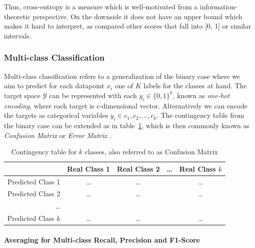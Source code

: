 Thus, cross-entropy is a measure which is well-motivated from a information-theoretic perspective. On the downside it does not have an upper bound which makes it hard to interpret, as compared other scores that fall into [0, 1] or similar intervals.

\subsubsection{Multi-class Classification}
\label{subs:Multi-class Classification}

Multi-class classification refers to a generalization of the binary case where we aim to predict for each datapoint $x_i$ one of $K$ labels for the classes at hand. The target space $\mathcal{Y}$ can be represented with each $y_i \in \{0,1\}^k$, known as \emph{one-hot encoding}, where each target is $c$-dimensional vector. Alternatively we can encode the targets as categorical variables $y_i \in {c_1, c_2, \ldots, c_k}$. The contingency table from the binary case can be extended as in table~\ref{table:contingency-table-k}, which is then commonly known as \emph{Confusion Matrix} or \emph{Error Matrix} .

\begin{center}
  \begin{table}[h]
  \begin{tabular}{r | c c c c }
    & Real Class 1 & Real Class 2 & \ldots & Real Class $k$ \\
    \hline
    Predicted Class 1    & \ldots & \ldots & & \ldots \\
    Predicted Class 2    & \ldots & \ldots & & \ldots \\
    \ldots               & & & & \\
    Predicted Class $k$  & \ldots & \ldots & & \ldots \\
  \end{tabular}
  \caption{Contingency table for $k$ classes, also referred to as Confusion Matrix}
\label{table:contingency-table-k}
\end{table}
\end{center}

\paragraph{Averaging for Multi-class Recall, Precision and F1-Score}
\label{par:Averaging for Multi-class Recall, Precision and F1-Score}

